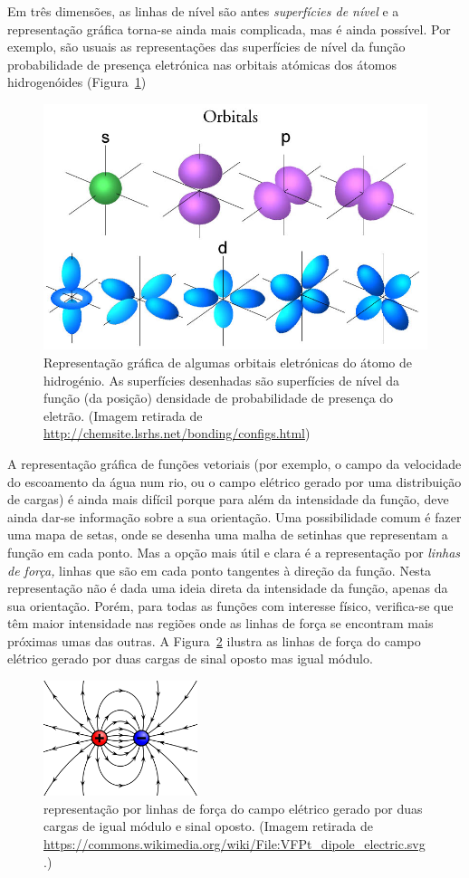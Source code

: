 Em três dimensões, as linhas de nível são antes \emph{superfícies de nível} e a
representação gráfica torna-se ainda mais complicada, mas é ainda possível. Por
exemplo, são usuais as representações das superfícies de nível da função
probabilidade de presença eletrónica nas orbitais atómicas dos átomos
hidrogenóides (Figura~\ref{fig:orbitals})
\begin{figure}[htb]
{\centering
\includegraphics[width=0.5\linewidth]{figs/f10-030.jpg}
\par
}
\caption{Representação gráfica de algumas orbitais eletrónicas do átomo de
hidrogénio. As superfícies desenhadas são superfícies de nível da função (da
posição) densidade de probabilidade de presença do eletrão. (Imagem retirada de
\protect\url{http://chemsite.lsrhs.net/bonding/configs.html})%
\label{fig:orbitals}}
\end{figure}

A representação gráfica de funções vetoriais (por exemplo, o campo da velocidade
do escoamento da água num rio, ou o campo elétrico gerado por uma distribuição
de cargas) é ainda mais difícil porque para além da intensidade da função, deve
ainda dar-se informação sobre a sua orientação. Uma possibilidade comum é fazer
uma mapa de setas, onde se desenha uma malha de setinhas que representam a
função em cada ponto. Mas a opção mais útil e clara é a representação por
\emph{linhas de força,} linhas que são em cada ponto tangentes à direção da
função. Nesta representação não é dada uma ideia direta da intensidade da função,
apenas da sua orientação. Porém, para todas as funções com interesse físico,
verifica-se que têm maior intensidade nas regiões onde as linhas de força se
encontram mais próximas umas das outras.  A Figura~\ref{fig:dipole} ilustra as
linhas de força do campo elétrico gerado por duas cargas de sinal oposto mas
igual módulo.
\begin{figure}[htb]
{\centering
\includegraphics[width=0.4\textwidth]{figs/f10-dipole.png}
\par
}
\caption{representação por linhas de força do campo elétrico gerado por duas
cargas de igual módulo e sinal oposto. (Imagem retirada de 
\protect\url{https://commons.wikimedia.org/wiki/File:VFPt_dipole_electric.svg}.)
\label{fig:dipole}}
\end{figure}



